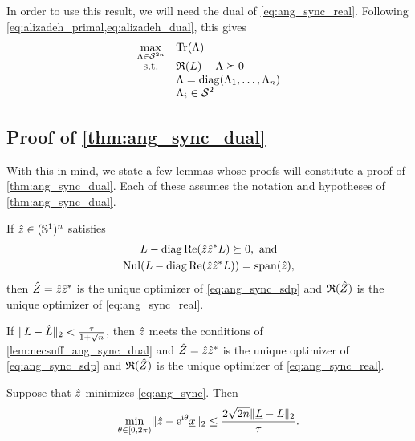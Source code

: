 In order to use this result, we will need the dual of \eqref{eq:ang_sync_real}.  Following \cref{eq:alizadeh_primal,eq:alizadeh_dual}, this gives
\begin{equation}
  \begin{array}{cl}
    \max\limits_{\Lambda \in \mathcal{S}^{2n}} & \operatorname{Tr}(\Lambda) \\
    \text{s.t.} & \mathfrak{R}(L) - \Lambda \succeq 0 \\
    & \Lambda = \operatorname{diag}(\Lambda_1, \ldots, \Lambda_n) \\
    & \Lambda_i \in \mathcal{S}^2
  \end{array} \label{eq:ang_sync_real_dual}
\end{equation}

\subsection{Proof of \cref{thm:ang_sync_dual}}
With this in mind, we state a few lemmas whose proofs will constitute a proof of \cref{thm:ang_sync_dual}.  Each of these assumes the notation and hypotheses of \cref{thm:ang_sync_dual}.

\begin{lemma}
  If $\hat{z} \in (\mathbb{S}^1)^n$ satisfies \begin{gather} L - \operatorname{diag}\operatorname{Re}(\hat{z} \hat{z}^* L) \succeq 0, \ \text{and} \label{eq:ang_sync_certificate} \\ \operatorname{Nul}(L - \operatorname{diag}\operatorname{Re}(\hat{z} \hat{z}^* L)) = \operatorname{span}(\hat{z}), \label{eq:ang_sync_nullspace} \end{gather} then $\hat{Z} = \hat{z} \hat{z}^*$ is the unique optimizer of \eqref{eq:ang_sync_sdp} and $\mathfrak{R}(\hat{Z})$ is the unique optimizer of \eqref{eq:ang_sync_real}.
  \label{lem:necsuff_ang_sync_dual}
\end{lemma}

\begin{lemma}
  If $\lVert L - \hat{L}\rVert_2 < \frac{\tau}{1 + \sqrt{n}}$, then $\hat{z}$ meets the conditions of \cref{lem:necsuff_ang_sync_dual} and $\hat{Z} = \hat{z} \hat{z}^*$ is the unique optimizer of \eqref{eq:ang_sync_sdp} and $\mathfrak{R}(\hat{Z})$ is the unique optimizer of \eqref{eq:ang_sync_real}.
  \label{lem:unique_ang_sync}
\end{lemma}

\begin{lemma}
  Suppose that $\hat{z}$ minimizes \eqref{eq:ang_sync}.  Then \[\min_{\theta \in [0, 2\pi)} \lVert \hat{z} - \mathrm{e}^{\mathrm{i} \theta} \underline{x} \rVert_2 \le \dfrac{2 \sqrt{2 n} \lVert\underline{L} - L\rVert_2}{\tau}.\]
    \label{lem:error_ang_sync}
\end{lemma}

